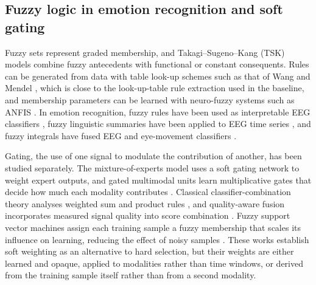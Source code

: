 \subsection{Fuzzy logic in emotion recognition and soft gating}
Fuzzy sets \cite{Zadeh1965} represent graded membership, and Takagi--Sugeno--Kang (TSK) models \cite{TakagiSugeno1985} combine fuzzy antecedents with functional or constant consequents. Rules can be generated from data with table look-up schemes such as that of Wang and Mendel \cite{WangMendel1992}, which is close to the look-up-table rule extraction used in the baseline, and membership parameters can be learned with neuro-fuzzy systems such as ANFIS \cite{Jang1993}. In emotion recognition, fuzzy rules have been used as interpretable EEG classifiers \cite{Matiko2014,FarhadiSedehi2024a}, fuzzy linguistic summaries have been applied to EEG time series \cite{Kaya2024}, and fuzzy integrals have fused EEG and eye-movement classifiers \cite{Lu2015,ChoKim1995}.

Gating, the use of one signal to modulate the contribution of another, has been studied separately. The mixture-of-experts model \cite{Jacobs1991} uses a soft gating network to weight expert outputs, and gated multimodal units learn multiplicative gates that decide how much each modality contributes \cite{Arevalo2020}. Classical classifier-combination theory analyses weighted sum and product rules \cite{Kittler1998}, and quality-aware fusion incorporates measured signal quality into score combination \cite{Nandakumar2008}. Fuzzy support vector machines assign each training sample a fuzzy membership that scales its influence on learning, reducing the effect of noisy samples \cite{LinWang2002}. These works establish soft weighting as an alternative to hard selection, but their weights are either learned and opaque, applied to modalities rather than time windows, or derived from the training sample itself rather than from a second modality.

